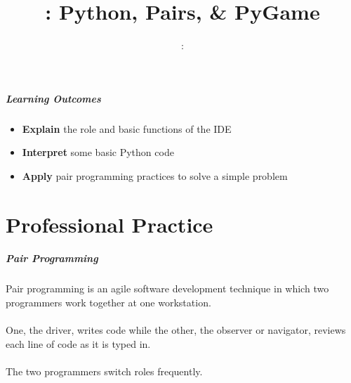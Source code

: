 \usepackage{../../beamerthemeFalmouthGamesAcademy}
\usepackage{multimedia}
\graphicspath{ {../../} }

\usepackage{textcomp}


\usepackage[normalem]{ulem}
\usepackage{wasysym}

\usepackage{pdfpages}

\usetikzlibrary{arrows,automata}







\title{\sessionnumber: Python, Pairs, \& PyGame}
\subtitle{\modulecode: \moduletitle}

\frame{\titlepage} 

\begin{frame}
	\frametitle{Learning Outcomes}
	\begin{itemize}
		\item \textbf{Explain} the role and basic functions of the IDE
		\item\textbf{Interpret} some basic Python code
		\item \textbf{Apply} pair programming practices to solve a simple problem
	\end{itemize}
\end{frame}





\part{Professional Practice}
\frame{\partpage}

\begin{frame}
	\frametitle{Pair Programming}
		
	Pair programming is an agile software development technique in which two programmers work together 
	at one workstation. 
	\\~\\
	One, the driver, writes code while the other, the observer or navigator, reviews 
	each line of code as it is typed in. 
	\\~\\
	The two programmers switch roles frequently.
	
\end{frame}


